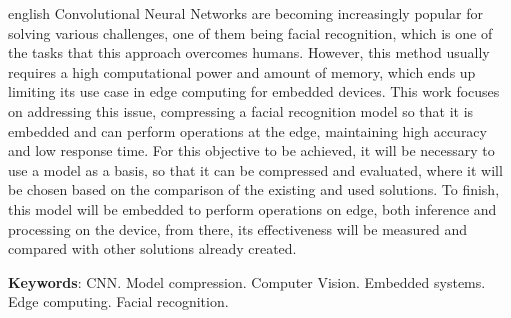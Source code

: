 \setlength{\absparsep}{18pt} %
\begin{resumo}[Abstract]
 \begin{otherlanguage*}{english}
   Convolutional Neural Networks are becoming increasingly popular for solving various challenges, one of them being
   facial recognition, which is one of the tasks that this approach overcomes humans.
   However, this method usually requires a high computational power and amount of memory, which ends up limiting its
   use case in edge computing for embedded devices.
   This work focuses on addressing this issue, compressing a facial recognition model so that it is embedded and can
   perform operations at the edge, maintaining high accuracy and low response time.
   For this objective to be achieved, it will be necessary to use a model as a basis, so that it can be compressed and
   evaluated, where it will be chosen based on the comparison of the existing and used
   solutions.
   To finish, this model will be embedded to perform operations on edge, both inference and processing on the device,
   from there, its effectiveness will be measured and compared with other solutions already created.

   \vspace{\onelineskip}

   \noindent
   \textbf{Keywords}: CNN. Model compression. Computer Vision. Embedded systems. Edge computing. Facial recognition.
 \end{otherlanguage*}
\end{resumo}
